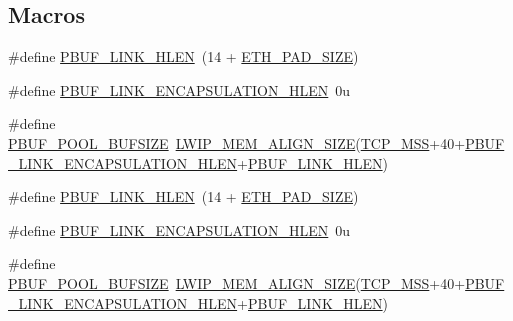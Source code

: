 \subsection*{Macros}
\begin{DoxyCompactItemize}
\item 
\#define \hyperlink{group__lwip__opts__pbuf_ga35998a3d56af9940e6a80bb372597685}{P\+B\+U\+F\+\_\+\+L\+I\+N\+K\+\_\+\+H\+L\+EN}~(14 + \hyperlink{group__lwip__opts__arp_gad7fa3b356ca7e603e848b069c4cc6276}{E\+T\+H\+\_\+\+P\+A\+D\+\_\+\+S\+I\+ZE})
\item 
\#define \hyperlink{group__lwip__opts__pbuf_ga6e1ba1875ae5168a17b53d83597bc1de}{P\+B\+U\+F\+\_\+\+L\+I\+N\+K\+\_\+\+E\+N\+C\+A\+P\+S\+U\+L\+A\+T\+I\+O\+N\+\_\+\+H\+L\+EN}~0u
\item 
\#define \hyperlink{group__lwip__opts__pbuf_gae61f4491d56e805e79b79eb5d35a00e5}{P\+B\+U\+F\+\_\+\+P\+O\+O\+L\+\_\+\+B\+U\+F\+S\+I\+ZE}~\hyperlink{group__compiler__abstraction_gaef204be511fd32f681b55abc08e9ae18}{L\+W\+I\+P\+\_\+\+M\+E\+M\+\_\+\+A\+L\+I\+G\+N\+\_\+\+S\+I\+ZE}(\hyperlink{group__lwip__opts__tcp_gaf1ab7bb27860aa3677c387a2f3ba317b}{T\+C\+P\+\_\+\+M\+SS}+40+\hyperlink{group__lwip__opts__pbuf_ga6e1ba1875ae5168a17b53d83597bc1de}{P\+B\+U\+F\+\_\+\+L\+I\+N\+K\+\_\+\+E\+N\+C\+A\+P\+S\+U\+L\+A\+T\+I\+O\+N\+\_\+\+H\+L\+EN}+\hyperlink{group__lwip__opts__pbuf_ga35998a3d56af9940e6a80bb372597685}{P\+B\+U\+F\+\_\+\+L\+I\+N\+K\+\_\+\+H\+L\+EN})
\item 
\#define \hyperlink{group__lwip__opts__pbuf_ga35998a3d56af9940e6a80bb372597685}{P\+B\+U\+F\+\_\+\+L\+I\+N\+K\+\_\+\+H\+L\+EN}~(14 + \hyperlink{group__lwip__opts__arp_gad7fa3b356ca7e603e848b069c4cc6276}{E\+T\+H\+\_\+\+P\+A\+D\+\_\+\+S\+I\+ZE})
\item 
\#define \hyperlink{group__lwip__opts__pbuf_ga6e1ba1875ae5168a17b53d83597bc1de}{P\+B\+U\+F\+\_\+\+L\+I\+N\+K\+\_\+\+E\+N\+C\+A\+P\+S\+U\+L\+A\+T\+I\+O\+N\+\_\+\+H\+L\+EN}~0u
\item 
\#define \hyperlink{group__lwip__opts__pbuf_gae61f4491d56e805e79b79eb5d35a00e5}{P\+B\+U\+F\+\_\+\+P\+O\+O\+L\+\_\+\+B\+U\+F\+S\+I\+ZE}~\hyperlink{group__compiler__abstraction_gaef204be511fd32f681b55abc08e9ae18}{L\+W\+I\+P\+\_\+\+M\+E\+M\+\_\+\+A\+L\+I\+G\+N\+\_\+\+S\+I\+ZE}(\hyperlink{group__lwip__opts__tcp_gaf1ab7bb27860aa3677c387a2f3ba317b}{T\+C\+P\+\_\+\+M\+SS}+40+\hyperlink{group__lwip__opts__pbuf_ga6e1ba1875ae5168a17b53d83597bc1de}{P\+B\+U\+F\+\_\+\+L\+I\+N\+K\+\_\+\+E\+N\+C\+A\+P\+S\+U\+L\+A\+T\+I\+O\+N\+\_\+\+H\+L\+EN}+\hyperlink{group__lwip__opts__pbuf_ga35998a3d56af9940e6a80bb372597685}{P\+B\+U\+F\+\_\+\+L\+I\+N\+K\+\_\+\+H\+L\+EN})
\end{DoxyCompactItemize}


